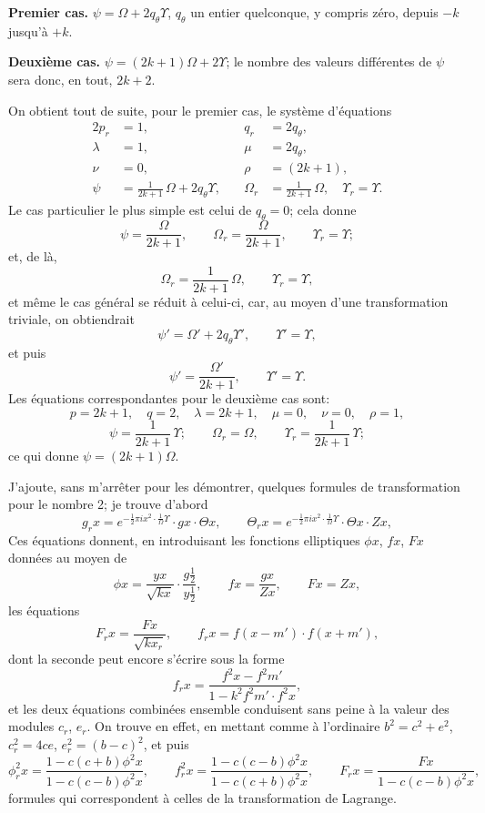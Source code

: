 \documentclass[11pt,a4paper]{article}
\theoremstyle{definition}
\begin{document}
\smallskip
\textbf{Premier cas.} $\psi = \Omega + 2q_\theta\Upsilon$, $q_\theta$ un entier
quelconque, y compris z\'ero, depuis $-k$ jusqu'\`a $+k$.

\smallskip
\textbf{Deuxi\`eme cas.} $\psi = (2k+1)\Omega + 2\Upsilon$;
le nombre des valeurs diff\'erentes de $\psi$ sera donc, en tout, $2k+2$.

\medskip

On obtient tout de suite, pour le premier cas, le syst\`eme d'\'equations
\begin{alignat*}{2}
p_r &= 1,\quad & q_r &= 2q_\theta, \\
\lambda &= 1,\quad & \mu &= 2q_\theta, \\
\nu &= 0,\quad & \rho &= (2k+1), \\
\psi &= \tfrac{1}{2k+1}\,\Omega + 2q_\theta\Upsilon,\quad &
\Omega_r &= \tfrac{1}{2k+1}\,\Omega, \quad
\Upsilon_r = \Upsilon.
\end{alignat*}
Le cas particulier le plus simple est celui de $q_\theta = 0$; cela donne
\[
\psi = \frac{\Omega}{2k+1}, \qquad
\Omega_r = \frac{\Omega}{2k+1}, \qquad
\Upsilon_r = \Upsilon;
\]
et, de l\`a,
\[
\Omega_r = \frac{1}{2k+1}\,\Omega, \qquad
\Upsilon_r = \Upsilon,
\]
et m\^eme le cas g\'en\'eral se r\'eduit \`a celui-ci, car, au moyen d'une
transformation triviale, on obtiendrait
\[
\psi' = \Omega' + 2q_\theta\Upsilon',\qquad \Upsilon' = \Upsilon,
\]
et puis
\[
\psi' = \frac{\Omega'}{2k+1},\qquad \Upsilon' = \Upsilon.
\]
Les \'equations correspondantes pour le deuxi\`eme cas sont:
\[
p=2k+1,\quad q=2,\quad
\lambda=2k+1,\quad \mu=0,\quad \nu=0,\quad \rho=1,
\]
\[
\psi = \frac{1}{2k+1}\,\Upsilon; \qquad
\Omega_r = \Omega, \qquad
\Upsilon_r = \frac{1}{2k+1}\,\Upsilon;
\]
ce qui donne $\psi = (2k+1)\Omega$.

\medskip

J'ajoute, sans m'arr\^eter pour les d\'emontrer, quelques formules de
transformation pour le nombre 2; je trouve d'abord
\[
g_r x = e^{-\frac{1}{2}\pi i x^2 \cdot \tfrac{1}{\Omega}\Upsilon}\cdot gx\cdot\Theta x,
\qquad
\Theta_r x = e^{-\frac{1}{2}\pi i x^2 \cdot \tfrac{1}{\Omega}\Upsilon}\cdot\Theta x\cdot Zx,
\]
Ces \'equations donnent, en introduisant les fonctions elliptiques
$\phi x$, $fx$, $Fx$ donn\'ees au moyen de
\[
\phi x = \frac{yx}{\sqrt{kx}}\cdot\frac{g\tfrac{1}{2}}{y\tfrac{1}{2}},\qquad
fx = \frac{gx}{Zx},\qquad
Fx = Zx,
\]
les \'equations
\[
F_r x = \frac{F x}{\sqrt{kx_r}},\qquad
f_r x = f(x-m') \cdot f(x+m'),
\]
dont la seconde peut encore s'\'ecrire sous la forme
\[
f_r x = \frac{f^2 x - f^2 m'}{1 - k^2 f^2 m' \cdot f^2 x},
\]
et les deux \'equations combin\'ees ensemble conduisent sans peine \`a la
valeur des modules $c_r$, $e_r$.
On trouve en effet, en mettant comme \`a l'ordinaire $b^2 = c^2 + e^2$,
$c_r^2 = 4ce$, $e_r^2 = (b-c)^2$, et puis
\[
\phi_r^2 x = \frac{1-c(c+b)\phi^2 x}{1-c(c-b)\phi^2 x},\qquad
f_r^2 x = \frac{1-c(c-b)\phi^2 x}{1-c(c+b)\phi^2 x},\qquad
F_r x = \frac{Fx}{1-c(c-b)\phi^2 x},
\]
formules qui correspondent \`a celles de la transformation de Lagrange.
\end{document}
